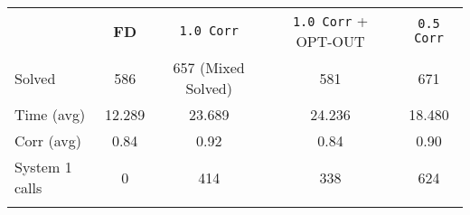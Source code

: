\documentclass[12pt,a4paper]{standalone}
\begin{document}
	
	
	\begin{tabular}{||l|c|c|c|c||}
		\hhline{|t:=====:t|}
		& \footnotesize{\textbf{FD}}  & \texttt{1.0 Corr}   & \texttt{1.0 Corr} + OPT-OUT  & \texttt{0.5 Corr}                           \\
		\hhline{||-----||}
		Solved   & 586 & 657 (Mixed Solved)     & 581    & {671}       \\
		\hhline{||-----||}
		Time (avg)  & 12.289  & 23.689  & 24.236 & 18.480 \\
		\hhline{||-----||}
		Corr (avg)   & 0.84       & 0.92  & 0.84 & {0.90}     \\
		\hhline{||-----||}
		System 1 calls   & 0       & 414 & 338 & 624 \\
		\hhline{|b:=====:b|}
	\end{tabular}
	
\end{document}
